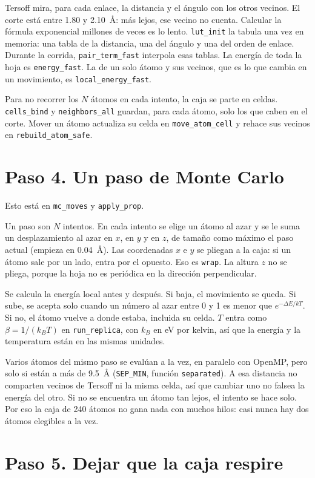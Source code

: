 \documentclass[11pt,a4paper]{article}
\newcommand{\fn}[1]{\texttt{#1}}
\begin{document}
Tersoff mira, para cada enlace, la distancia y el ángulo con los otros vecinos. El corte está entre 1.80 y 2.10~Å: más lejos, ese vecino no cuenta. Calcular la fórmula exponencial millones de veces es lo lento. \fn{lut\_init} la tabula una vez en memoria: una tabla de la distancia, una del ángulo y una del orden de enlace. Durante la corrida, \fn{pair\_term\_fast} interpola esas tablas. La energía de toda la hoja es \fn{energy\_fast}. La de un solo átomo y sus vecinos, que es lo que cambia en un movimiento, es \fn{local\_energy\_fast}.

Para no recorrer los $N$ átomos en cada intento, la caja se parte en celdas. \fn{cells\_bind} y \fn{neighbors\_all} guardan, para cada átomo, solo los que caben en el corte. Mover un átomo actualiza su celda en \fn{move\_atom\_cell} y rehace sus vecinos en \fn{rebuild\_atom\_safe}.

\section{Paso 4. Un paso de Monte Carlo}

Esto está en \fn{mc\_moves} y \fn{apply\_prop}.

Un paso son $N$ intentos. En cada intento se elige un átomo al azar y se le suma un desplazamiento al azar en $x$, en $y$ y en $z$, de tamaño como máximo el paso actual (empieza en 0.04~Å). Las coordenadas $x$ e $y$ se pliegan a la caja: si un átomo sale por un lado, entra por el opuesto. Eso es \fn{wrap}. La altura $z$ no se pliega, porque la hoja no es periódica en la dirección perpendicular.

Se calcula la energía local antes y después. Si baja, el movimiento se queda. Si sube, se acepta solo cuando un número al azar entre 0 y 1 es menor que $e^{-\Delta E/kT}$. Si no, el átomo vuelve a donde estaba, incluida su celda. $T$ entra como $\beta=1/(k_B T)$ en \fn{run\_replica}, con $k_B$ en eV por kelvin, así que la energía y la temperatura están en las mismas unidades.

Varios átomos del mismo paso se evalúan a la vez, en paralelo con OpenMP, pero solo si están a más de 9.5~Å (\fn{SEP\_MIN}, función \fn{separated}). A esa distancia no comparten vecinos de Tersoff ni la misma celda, así que cambiar uno no falsea la energía del otro. Si no se encuentra un átomo tan lejos, el intento se hace solo. Por eso la caja de 240 átomos no gana nada con muchos hilos: casi nunca hay dos átomos elegibles a la vez.

\section{Paso 5. Dejar que la caja respire}
\end{document}
